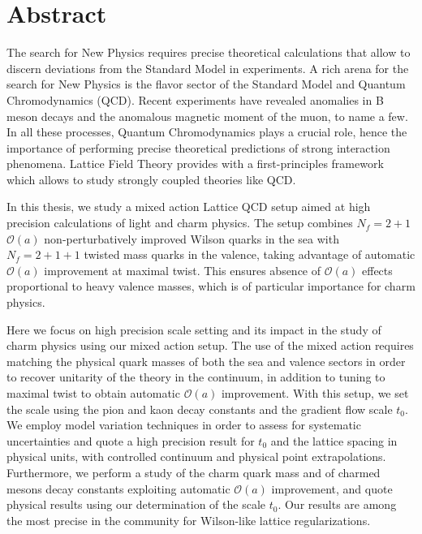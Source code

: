 \begingroup
\let\clearpage\relax
\let\cleardoublepage\relax
\let\cleardoublepage\relax

\chapter*{Abstract}
The search for New Physics requires precise theoretical calculations that allow to discern deviations from the Standard Model in experiments. A rich arena for the search for New Physics is the flavor sector of the Standard Model and Quantum Chromodynamics (QCD). Recent experiments have revealed anomalies in B meson decays and the anomalous magnetic moment of the muon, to name a few. In all these processes, Quantum Chromodynamics plays a crucial role, hence the importance of performing precise theoretical predictions of strong interaction phenomena. Lattice Field Theory provides with a first-principles framework which allows to study strongly coupled theories like QCD.

In this thesis, we study a mixed action Lattice QCD setup aimed at high precision calculations of light and charm physics. The setup combines $N_f=2+1$ $\mathcal{O}(a)$ non-perturbatively improved Wilson quarks in the sea with $N_f=2+1+1$ twisted mass quarks in the valence, taking advantage of automatic $\mathcal{O}(a)$ improvement at maximal twist. This ensures absence of $\mathcal{O}(a)$ effects proportional to heavy valence masses, which is of particular importance for charm physics. 

Here we focus on high precision scale setting and its impact in the study of charm physics using our mixed action setup. The use of the mixed action requires matching the physical quark masses of both the sea and valence sectors in order to recover unitarity of the theory in the continuum, in addition to tuning to maximal twist to obtain automatic $\mathcal{O}(a)$ improvement. With this setup, we set the scale using the pion and kaon decay constants and the gradient flow scale $t_0$. We employ model variation techniques in order to assess for systematic uncertainties and quote a high precision result for $t_0$ and the lattice spacing in physical units, with controlled continuum and physical point extrapolations. Furthermore, we perform a study of the charm quark mass and of charmed mesons decay constants exploiting automatic $\mathcal{O}(a)$ improvement, and quote physical results using our determination of the scale $t_0$. Our results are among the most precise in the community for Wilson-like lattice regularizations.

